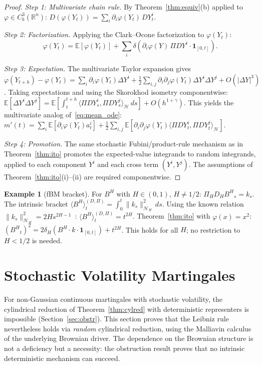 \documentclass[11pt,a4paper]{article}
\theoremstyle{plain}
\theoremstyle{definition}
\newtheorem{example}[theorem]{Example}
\theoremstyle{remark}
\newcommand{\E}{\mathbb{E}}
\newcommand{\R}{\mathbb{R}}
\newcommand{\HH}{\mathcal{H}_H}
\newcommand{\BH}{B^H}
\begin{document}
\begin{proof}
\emph{Step 1: Multivariate chain rule.} By Theorem~\ref{thm:equiv}(b) applied to $\varphi \in C_b^3(\R^n)$: $D(\varphi(Y_t)) = \sum_i\partial_i\varphi(Y_t)\,DY^i_t$.

\emph{Step 2: Factorization.} Applying the Clark--Ocone factorization to $\varphi(Y_t)$:
\[
\varphi(Y_t) = \E[\varphi(Y_t)] + \sum_i\delta(\partial_i\varphi(Y)\,\Pi DY^i\cdot\mathbf{1}_{[0,t]}).
\]

\emph{Step 3: Expectation.} The multivariate Taylor expansion gives $\varphi(Y_{t+h})-\varphi(Y_t) = \sum_i\partial_i\varphi(Y_t)\Delta Y^i + \frac{1}{2}\sum_{i,j}\partial_i\partial_j\varphi(Y_t)\Delta Y^i\Delta Y^j + O(|\Delta Y|^3)$. Taking expectations and using the Skorokhod isometry componentwise: $\E[\Delta Y^i\Delta Y^j] = \E[\int_t^{t+h}\langle\Pi DY^i_s,\Pi DY^j_s\rangle_{\mathcal{H}}\,ds] + O(h^{1+\gamma})$. This yields the multivariate analog of~\eqref{eq:mean_ode}: $m'(t) = \sum_i\E[\partial_i\varphi(Y_t)a^i_t] + \frac{1}{2}\sum_{i,j}\E[\partial_i\partial_j\varphi(Y_t)\langle\Pi DY^i_t,\Pi DY^j_t\rangle_{\mathcal{H}}]$.

\emph{Step 4: Promotion.} The same stochastic Fubini/product-rule mechanism as in Theorem~\ref{thm:ito} promotes the expected-value integrands to random integrands, applied to each component $Y^i$ and each cross term $(Y^i,Y^j)$. The assumptions of Theorem~\ref{thm:ito}(i)--(ii) are required componentwise.
\end{proof}

\begin{example}[fBM bracket]\label{ex:fbm_bracket_ex}
For $\BH$ with $H \in (0,1)$, $H \neq 1/2$: $\Pi_HD_H{\BH}_s = k_s$. The intrinsic bracket $\langle\BH\rangle_t^{(D,\Pi)} = \int_0^t\|k_s\|^2_{\HH}\,ds$. Using the known relation $\|k_s\|^2_{\HH} = 2Hs^{2H-1}$~\cite{Decreusefond1999}: $\langle\BH\rangle_t^{(D,\Pi)} = t^{2H}$. Theorem~\ref{thm:ito} with $\varphi(x) = x^2$: $({\BH}_t)^2 = 2\delta_H(\BH\cdot k\cdot\mathbf{1}_{[0,t]})+t^{2H}$. This holds for all $H$; no restriction to $H < 1/2$ is needed.
\end{example}

\section{Stochastic Volatility Martingales}\label{sec:sv}

For non-Gaussian continuous martingales with stochastic volatility, the cylindrical reduction of Theorem~\ref{thm:cylred} with deterministic representers is impossible (Section~\ref{sec:obstr}). This section proves that the Leibniz rule nevertheless holds via \emph{random} cylindrical reduction, using the Malliavin calculus of the underlying Brownian driver. The dependence on the Brownian structure is not a deficiency but a necessity: the obstruction result proves that no intrinsic deterministic mechanism can succeed.
\end{document}
